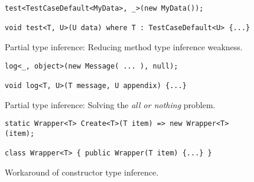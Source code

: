 \par
{}
{}
\begin{figure}
\begin{lstlisting}[style=csharp]
test<TestCaseDefault<MyData>, _>(new MyData());

void test<T, U>(U data) where T : TestCaseDefault<U> {...}
\end{lstlisting}
\caption{Partial type inference: Reducing method type inference weakness.}
\label{img32}
\end{figure}
\par
{}
\begin{figure}
\begin{lstlisting}[style=csharp]
log<_, object>(new Message( ... ), null);

void log<T, U>(T message, U appendix) {...}
\end{lstlisting}
\caption{Partial type inference: Solving the \textit{all or nothing} problem.}
\label{img33}
\end{figure}
\par
{}
\begin{figure}
\begin{lstlisting}[style=csharp]
static Wrapper<T> Create<T>(T item) => new Wrapper<T>(item);

class Wrapper<T> { public Wrapper(T item) {...} }
\end{lstlisting}
\caption{Workaround of constructor type inference.}
\label{img34}
\end{figure}
